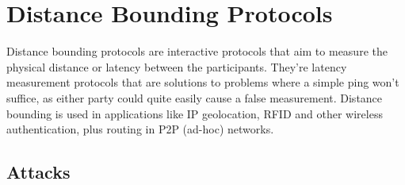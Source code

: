 \section{Distance Bounding Protocols}

Distance bounding protocols are interactive protocols that aim to measure the physical distance or latency between the participants. They're latency measurement protocols that are solutions to problems where a simple ping won't suffice, as either party could quite easily cause a false measurement. Distance bounding is used in applications like IP geolocation, RFID and other wireless authentication, plus routing in P2P (ad-hoc) networks.


\subsection{Attacks}